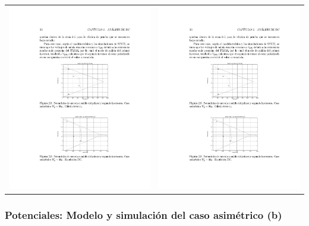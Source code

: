 \documentclass[
paper=128mm:96mm, %
fontsize=11pt, %
pagesize, %
parskip=half-, %
]{scrartcl} %
\theoremstyle{mythmstyle} %
\begin{document}
\begin{table}[ht]
\centering
\begin{tabular}{cc}
\includegraphics[width=0.45\linewidth]{ModeloAsimetricoA}&\includegraphics[width=0.45\linewidth]{SimulacionAsimetricoA}\\
\end{tabular}
\label{tab:gt}
\end{table}

\clearpage

\subsubsection{Potenciales: Modelo y simulación del caso asimétrico (b)}
\label{sec:asimetricoB}
\end{document}
